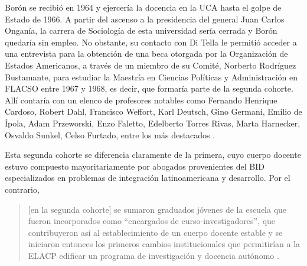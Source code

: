 Borón se recibió en 1964 y ejercería la docencia en la UCA hasta el golpe de Estado de 1966. A partir del ascenso a la presidencia del general Juan Carlos Onganía, la carrera de Sociología de esta universidad sería cerrada y Borón quedaría sin empleo. No obstante, su contacto con Di Tella le permitió acceder a una entrevista para la obtención de una beca otorgada por la Organización de Estados Americanos, a través de un miembro de su Comité, Norberto Rodríguez Bustamante, para estudiar la Maestría en Ciencias Políticas y Administración en FLACSO entre 1967 y 1968, es decir, que formaría parte de la segunda cohorte. Allí contaría con un elenco de profesores notables como Fernando Henrique Cardoso, Robert Dahl, Francisco Weffort, Karl Deutsch, Gino Germani, Emilio de Ípola, Adam Przeworski, Enzo Faletto, Edelberto Torres Rivas, Marta Harnecker, Osvaldo Sunkel, Celso Furtado, entre los más destacados \parencite{1444-BORON2023}.

Esta segunda cohorte se diferencia claramente de la primera, cuyo cuerpo docente estuvo compuesto mayoritariamente por abogados provenientes del BID especializados en problemas de integración latinoamericana y desarrollo. Por el contrario,

\begin{quote}
[en la segunda cohorte] se sumaron graduados jóvenes de la escuela que fueron incorporados como \enquote{encargados de curso-investigadores}, que contribuyeron así al establecimiento de un cuerpo docente estable y se iniciaron entonces los primeros cambios institucionales que permitirían a la ELACP edificar un programa de investigación y docencia autónomo \parencite[82]{1515-ABARZUACUTRONI2014}.
\end{quote}

